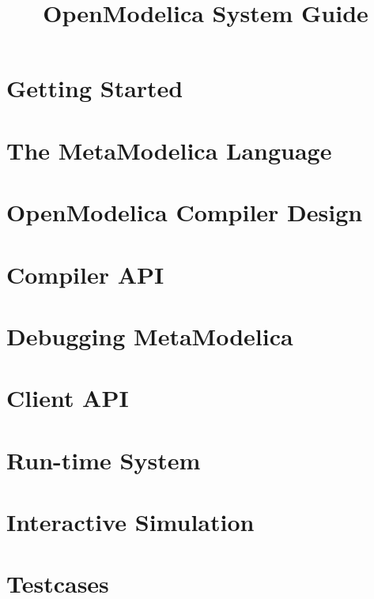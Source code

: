 \documentclass{article}
\begin{document}



\title{OpenModelica System Guide}
\maketitle

\section{Getting Started}
\section{The MetaModelica Language}
\label{sec:metamodelica}
\section{OpenModelica Compiler Design}

\section{Compiler API}
\section{Debugging MetaModelica}
\section{Client API}
\section{Run-time System}
\section{Interactive Simulation}
\section{Testcases}


\printglossary[title=Acronyms]

\label{pkg:Absyn}
\label{pkg:Parser}
\label{pkg:Main}
\label{fun:Parser.parse}
\end{document}
